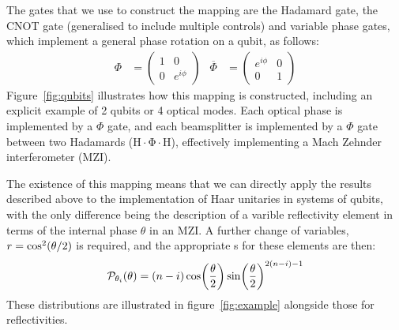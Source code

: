 The gates that we use to
construct the mapping are the Hadamard gate, the CNOT gate (generalised to
include multiple controls) and variable phase gates, which implement a general
phase rotation on a qubit, as follows:
\begin{align}
  \Phi &= \begin{pmatrix}
    1 & 0 \\
    0 & e^{i\phi}
  \end{pmatrix} &
  \overline{\Phi} &= \begin{pmatrix}
    e^{i\phi} & 0 \\
    0 & 1
  \end{pmatrix}
\end{align}
Figure~\ref{fig:qubits} illustrates how this mapping is constructed, including
an explicit example of 2 qubits or 4 optical modes. Each optical phase is
implemented by a \(\Phi\) gate, and each beamsplitter is implemented by a
\(\Phi\) gate between two Hadamards (\(\mathrm{H \cdot \Phi \cdot H}\)),
effectively implementing a Mach Zehnder interferometer (MZI).

The existence of this mapping means that we can directly apply the results
described above to the implementation of Haar unitaries in systems of qubits,
with the only difference being the description of a varible reflectivity element
in terms of the internal phase \(\theta\) in an MZI. A further change of
variables, \(r = \cos^{2} \!\left(\theta/2\right) \) is required, and the appropriate
\pdf{}s for these elements are then:
\begin{equation}
  \mathcal{P}_{\theta_{i}} \!\left( \theta \right) = \left( n-i \right) \cos \!\left(
  \frac{\theta}{2} \right) \sin \!\left( \frac{\theta}{2} \right)^{2 \left(n-i\right) -1}
\end{equation}
These distributions are illustrated in figure~\ref{fig:example} alongside those
for reflectivities.

